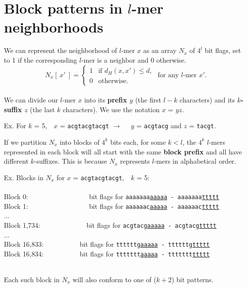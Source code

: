 \documentclass[oneside,12pt]{DISCSthesis}
\begin{document}
{	\section{\boldmath Block patterns in $l$-mer neighborhoods}
		We can represent the neighborhood of $l$-mer $x$ as an array $N_x$ of $4^{l}$ bit flags, set to 1 if the corresponding $l$-mer is a neighbor and 0 otherwise.\\
		\begin{equation}
			N_{x}[\ x'\ ] = \left\{
			\begin{array}{rl}
				1 & \text{if } d_H(x,x') \leq d,\\
				0 & \text{otherwise.}
			\end{array} \right.
			\text{ for any $l$-mer }x'.
			\end{equation}\\
		\noindent We can divide our $l$-mer $x$ into its {\bf\boldmath prefix $y$} (the first $l-k$ characters) and its {\bf\boldmath $k$-suffix $z$} (the last $k$ characters). We use the notation $x$ = $yz$.
		\begin{center}
			Ex. For $k$ = 5,\ \ $x$ = \texttt{acgtacgtacgt} $\rightarrow$ \ \ $y$ = \texttt{acgtacg} and $z$ = \texttt{tacgt}.
			\end{center}
		\newpage
		\noindent If we partition $N_x$ into blocks of $4^k$ bits each, for some $k < l$, the $4^k$ $l$-mers represented in each block will all start with the same {\bf block prefix} and all have different $k$-suffixes.	This is because $N_x$ represents $l$-mers in alphabetical order.
		\begin{center} 
			Ex. Blocks in $N_x$ for $x$ = \texttt{acgtacgtacgt},\ \ $k$ = 5:
			\ \ \ \ \ \ \ \ \ \ \ \ \ \ \ \ \ \ \ \ \ \ \ \ \ \ \ \ \ \ \\
			\footnotesize
			Block 0:\ \ \ \ \ \ \ \ \ \ \ \ \ \ \ \ \ \ bit flags for \texttt{{aaaaaaa}\ul{aaaaa} - {aaaaaaa}\ul{ttttt}}\\
			Block 1:\ \ \ \ \ \ \ \ \ \ \ \ \ \ \ \ \ \ bit flags for \texttt{{aaaaaac}\ul{aaaaa} - {aaaaaac}\ul{ttttt}}\\...\\
			Block 1,734:      \ \ \ \ \ \ \ \ \ \ \ \ \ bit flags for \texttt{{acgtacg}\ul{aaaaa} - {acgtacg}\ul{ttttt}}\\...\\
			Block 16,833:           \ \ \ \ \ \ \ \ \ \ bit flags for \texttt{{ttttttg}\ul{aaaaa} - {ttttttg}\ul{ttttt}}\\
			Block 16,834:           \ \ \ \ \ \ \ \ \ \ bit flags for \texttt{{ttttttt}\ul{aaaaa} - {ttttttt}\ul{ttttt}}\\\ \\
			\end{center}
		\noindent Each such block in $N_x$ will also conform to one of ($k+2$) bit patterns.\vspace*{4mm}

}
\end{document}
